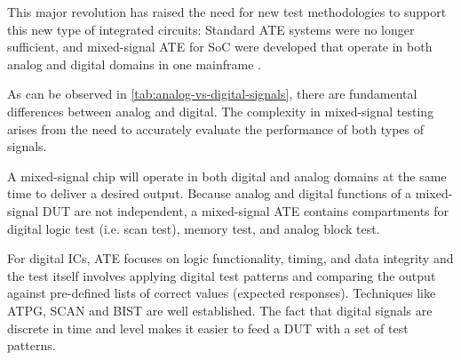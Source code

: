 This major revolution has raised the need for new test methodologies to support
this new type of integrated circuits: Standard \ac{ATE} systems were no longer
sufficient, and mixed-signal \ac{ATE} for \ac{SoC} were developed that operate
in both analog and digital domains in one mainframe \autocite{Tsuboshita}.

As can be observed in \autoref{tab:analog-vs-digital-signals}, there are
fundamental differences between analog and digital.
The complexity in mixed-signal testing arises from the need to accurately
evaluate the performance of both types of signals.

\begin{table}[]
    \caption[Analog v.s. Digital signals]{A list of major differences between
    analog and digital signals.}
    \label{tab:analog-vs-digital-signals}
\end{table}



A mixed-signal chip will operate in both digital and analog domains at the same
time to deliver a desired output.
Because analog and digital functions of a mixed-signal \ac{DUT} are not
independent, a mixed-signal \ac{ATE} contains compartments for digital logic
test (i.e. scan test), memory test, and analog block test.

For digital \ac{IC}s, \ac{ATE} focuses on logic functionality, timing, and
data integrity and the test itself involves applying digital test
patterns and comparing the output against pre-defined lists of correct values
(expected responses).
Techniques like \ac{ATPG}, SCAN and \ac{BIST} are well established.
The fact that digital signals are discrete in time and level makes it easier to
feed a \ac{DUT} with a set of test patterns.

